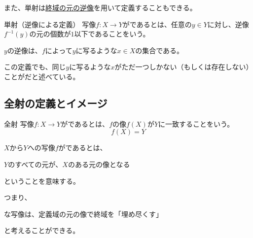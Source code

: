 \documentclass[../../../topic_linear-algebra]{subfiles}
\begin{document}
\begin{center}
\end{center}

また、単射は\hyperref[def:preimage-of-element]{終域の元の逆像}を用いて定義することもできる。

\begin{definition*}{単射（逆像による定義）}
  写像$f\colon X \to Y$がであるとは、任意の$y \in Y$に対し、逆像$f^{-1}(y)$の元の個数が$1$以下であることをいう。
\end{definition*}

$y$の逆像は、$f$によって$y$に写るような$x \in X$の集合である。

この定義でも、同じ$y$に写るような$x$がただ一つしかない（もしくは存在しない）ことがだと述べている。

\subsection{全射の定義とイメージ}

\begin{definition*}{全射}
  写像$f\colon X \to Y$がであるとは、$f$の像$f(X)$が$Y$に一致することをいう。
  \begin{equation*}
    f(X) = Y
  \end{equation*}
\end{definition*}

$X$から$Y$への写像$f$がであるとは、
\begin{emphabox}
  \begin{spacebox}
    \begin{center}
      $Y$のすべての元が、$X$のある元の像となる
    \end{center}
  \end{spacebox}
\end{emphabox}
ということを意味する。

\br

つまり、
\begin{emphabox}
  \begin{spacebox}
    \begin{center}
      な写像は、定義域の元の像で終域を「埋め尽くす」
    \end{center}
  \end{spacebox}
\end{emphabox}
と考えることができる。
\end{document}
